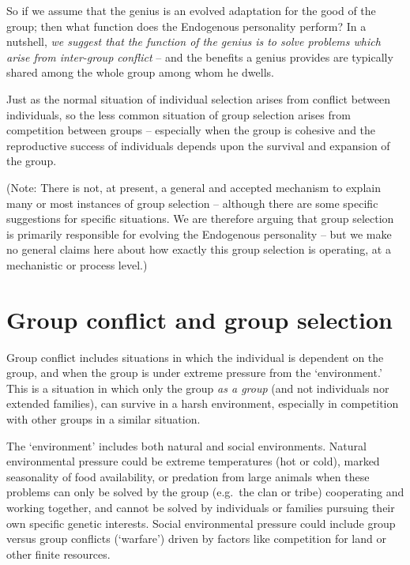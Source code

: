 \documentclass[
]{book}
\begin{document}
So if we assume that the genius is an evolved adaptation for the good of the group; then what function does the Endogenous personality perform? In a nutshell, \emph{we suggest that the function of the genius is to solve problems which arise from inter-group conflict} -- and the benefits a genius provides are typically shared among the whole group among whom he dwells.

Just as the normal situation of individual selection arises from conflict between individuals, so the less common situation of group selection arises from competition between groups -- especially when the group is cohesive and the reproductive success of individuals depends upon the survival and expansion of the group.

(Note: There is not, at present, a general and accepted mechanism to explain many or most instances of group selection -- although there are some specific suggestions for specific situations. We are therefore arguing that group selection is primarily responsible for evolving the Endogenous personality -- but we make no general claims here about how exactly this group selection is operating, at a mechanistic or process level.)

\hypertarget{group-conflict-and-group-selection}{%
\section{Group conflict and group selection}\label{group-conflict-and-group-selection}}

Group conflict includes situations in which the individual is dependent on the group, and when the group is under extreme pressure from the `environment.' This is a situation in which only the group \emph{as a group} (and not individuals nor extended families), can survive in a harsh environment, especially in competition with other groups in a similar situation.

The `environment' includes both natural and social environments. Natural environmental pressure could be extreme temperatures (hot or cold), marked seasonality of food availability, or predation from large animals when these problems can only be solved by the group (e.g.~the clan or tribe) cooperating and working together, and cannot be solved by individuals or families pursuing their own specific genetic interests. Social environmental pressure could include group versus group conflicts (`warfare') driven by factors like competition for land or other finite resources.
\end{document}
